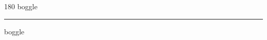 
\begin{frame}
\begin{center}
\begin{turn}{180}
{\fontsize{2.5cm}{1em}\selectfont boggle}
\end{turn}
\vspace{1em}\par  
\hrule
\vspace{1em}\par  
{\fontsize{2.5cm}{1em}\selectfont boggle}
\end{center}
\end{frame}
